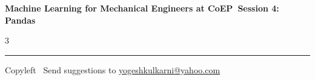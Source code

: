 \documentclass[8pt,landscape]{article}
\begin{document}
\footnotesize

\begin{center}
\Large{\textbf{Machine Learning for Mechanical Engineers at CoEP\ Session 4: Pandas}}
\end{center}

\begin{multicols}{3}

\end{multicols}

\rule{\linewidth}{0.25pt}
\scriptsize
Copyleft \textcopyleft\  Send suggestions to
\href{http://www.yogeshkulkarni.com}{yogeshkulkarni@yahoo.com}
\end{document}
